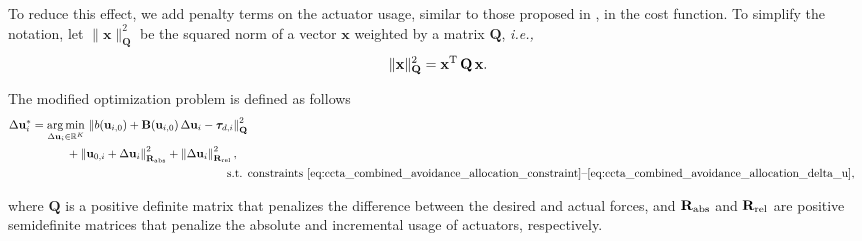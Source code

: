 To reduce this effect, we add penalty terms on the actuator usage, similar to those proposed in \cite{johansen_constrained_2004}, in the cost function.
To simplify the notation, let $\|\mathbf{x}\|_{\mathbf{Q}}^2$ be the squared norm of a vector $\mathbf{x}$ weighted by a matrix $\mathbf{Q}$, \emph{i.e.,}
\begin{equation}
    \|\mathbf{x}\|_{\mathbf{Q}}^2 = \mathbf{x}^{\rm T}\,\mathbf{Q}\,\mathbf{x}.
\end{equation}

The modified optimization problem is defined as follows
\begin{subequations}
    \begin{align}
    \begin{split}
        \Delta\mathbf{u}_{i}^* &= \operatorname*{arg\,min}_{\Delta\mathbf{u}_{i}\in\mathbb{R}^{K}}\,\left\| b(\mathbf{u}_{i,0}) + \mathbf{B}(\mathbf{u}_{i,0})\,\Delta\mathbf{u}_{i} - \bm{\tau}_{d,i} \right\|_{\mathbf{Q}}^2 \\
        &\quad \quad \quad + \left\| \mathbf{u}_{0,i} + \Delta\mathbf{u}_{i} \right\|_{\mathbf{R}_{\rm abs}}^2 + \left\|\Delta\mathbf{u}_{i}\right\|_{\mathbf{R}_{\rm rel}}^2,
    \end{split} \\    
    \text{s.t. }&\text{constraints \eqref{eq:ccta_combined_avoidance_allocation_constraint}--\eqref{eq:ccta_combined_avoidance_allocation_delta_u},}
    \end{align}
    \label{eq:ccta_combined_avoidance_allocation_modified}
\end{subequations}
\vspace*{-1em}

\noindent where $\mathbf{Q}$ is a positive definite matrix that penalizes the difference between the desired and actual forces, and $\mathbf{R}_{\rm abs}$ and $\mathbf{R}_{\rm rel}$ are positive semidefinite matrices that penalize the absolute and incremental usage of actuators, respectively.

